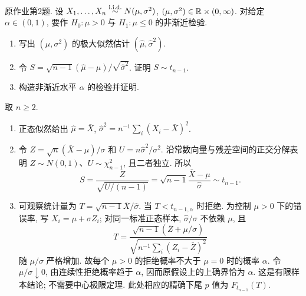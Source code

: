 \begin{exercise}\label{ps06:p02}
原作业第2题. 设 $X_1,\ldots,X_n\stackrel{\mathrm{i.i.d.}}{\sim} N(\mu,\sigma^2)$, $(\mu,\sigma^2)\in\mathbb R\times(0,\infty)$. 对给定 $\alpha\in(0,1)$, 要作 $H_0:\mu>0$ 与 $H_1:\mu\le0$ 的非渐近检验.
\begin{enumerate}[label=\arabic*.]
\item 写出 $(\mu,\sigma^2)$ 的极大似然估计 $(\hat\mu,\hat\sigma^2)$.
\item 令 $S=\sqrt{n-1}(\hat\mu-\mu)/\sqrt{\hat\sigma^2}$. 证明 $S\sim t_{n-1}$.
\item 构造非渐近水平 $\alpha$ 的检验并证明.
\end{enumerate}
\end{exercise}
\begin{solution}
取 $n\ge2$.
\begin{enumerate}[label=\arabic*.]
\item 正态似然给出 $\hat\mu=\bar X$, $\hat\sigma^2=n^{-1}\sum_i(X_i-\bar X)^2$.
\item 令 $Z=\sqrt n(\bar X-\mu)/\sigma$ 和 $U=n\hat\sigma^2/\sigma^2$. 沿常数向量与残差空间的正交分解表明 $Z\sim N(0,1)$、$U\sim\chi^2_{n-1}$, 且二者独立. 所以
\[
S=\frac{Z}{\sqrt{U/(n-1)}}=\sqrt{n-1}\frac{\bar X-\mu}{\hat\sigma}\sim t_{n-1}.
\]
\item 可观察统计量为 $T=\sqrt{n-1}\bar X/\hat\sigma$. 当 $T<t_{n-1,\alpha}$ 时拒绝. 为控制 $\mu>0$ 下的错误率, 写 $X_i=\mu+\sigma Z_i$; 对同一标准正态样本, $\hat\sigma/\sigma$ 不依赖 $\mu$, 且
\[
T=\frac{\sqrt{n-1}(\bar Z+\mu/\sigma)}{\sqrt{n^{-1}\sum_i(Z_i-\bar Z)^2}}
\]
随 $\mu/\sigma$ 严格增加. 故每个 $\mu>0$ 的拒绝概率不大于 $\mu=0$ 时的概率 $\alpha$. 令 $\mu/\sigma\downarrow0$, 由连续性拒绝概率趋于 $\alpha$, 因而原假设上的上确界恰为 $\alpha$. 这是有限样本结论; 不需要中心极限定理. 此处相应的精确下尾 $p$ 值为 $F_{t_{n-1}}(T)$.
\end{enumerate}
\end{solution}

